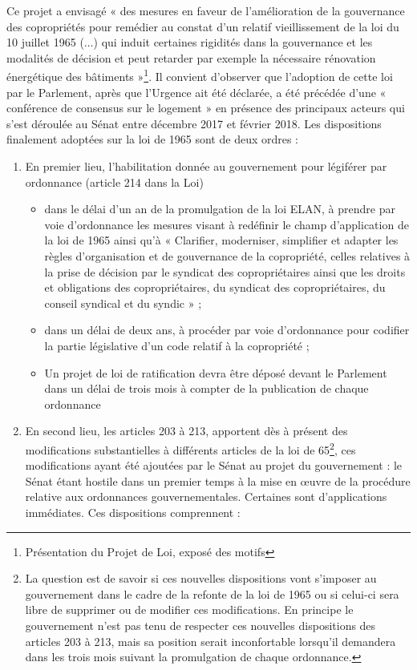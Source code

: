 			Ce projet a envisagé « des mesures en faveur de l’amélioration de la gouvernance des copropriétés pour remédier au constat d’un relatif vieillissement de la loi du 10 juillet 1965 ($\dots$) qui induit certaines rigidités dans la gouvernance et les modalités de décision et peut retarder par exemple la nécessaire rénovation énergétique des bâtiments »\footnote{Présentation du Projet de Loi, exposé des motifs}.
			Il convient d’observer que l’adoption de cette loi par le Parlement, après que l’Urgence ait été déclarée, a été précédée d’une « conférence de consensus sur le logement » en présence des principaux acteurs qui s’est déroulée au Sénat entre décembre 2017 et février 2018.
			Les dispositions finalement adoptées sur la loi de 1965 sont de deux ordres :
			\begin{enumerate}[label=\roman*)]
				\item En premier lieu, l’habilitation donnée au gouvernement pour légiférer par ordonnance (article 214 dans la Loi)
				\begin{itemize}
					\item dans le délai d’un an de la promulgation de la loi ELAN, à prendre par voie d’ordonnance les mesures visant à redéfinir le champ d’application de la loi de 1965 ainsi qu’à « Clarifier, moderniser, simplifier et adapter les règles d’organisation et de gouvernance de la copropriété, celles relatives à la prise de décision par le syndicat des copropriétaires ainsi que les droits et obligations des copropriétaires, du syndicat des copropriétaires, du conseil syndical et du syndic » ;
					\item dans un délai de deux ans, à procéder par voie d’ordonnance pour codifier la partie législative d’un code relatif à la copropriété ;
					\item  Un projet de loi de ratification devra être déposé devant le Parlement dans un délai de trois mois à compter de la publication de chaque ordonnance
				\end{itemize}
				\item  En second lieu, les articles 203 à 213, apportent dès à présent des modifications substantielles à différents articles de la loi de 65\footnote{La question est de savoir si ces nouvelles dispositions vont s’imposer au gouvernement dans le cadre de la refonte de la loi de 1965 ou si celui-ci sera libre de supprimer ou de modifier ces modifications. En principe le gouvernement n’est pas tenu de respecter ces nouvelles dispositions des articles 203 à 213, mais sa position serait inconfortable lorsqu’il demandera dans les trois mois suivant la promulgation de chaque ordonnance.}, ces modifications ayant été ajoutées par le Sénat au projet du gouvernement : le Sénat étant hostile dans un premier temps à la mise en œuvre de la procédure relative aux ordonnances gouvernementales. Certaines sont d’applications immédiates. Ces dispositions comprennent :

\end{enumerate}
